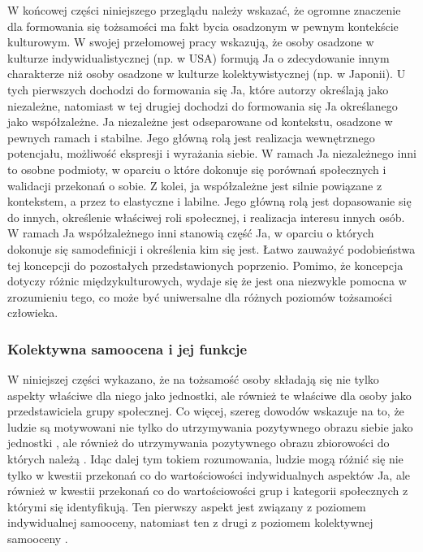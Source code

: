 \documentclass[man]{apa6}
\begin{document}
W końcowej części niniejszego przeglądu należy wskazać, że ogromne znaczenie dla formowania się tożsamości ma fakt bycia osadzonym w pewnym kontekście kulturowym. W swojej przełomowej pracy \textcite{markus1991culture} wskazują, że osoby osadzone w kulturze indywidualistycznej (np. w USA) formują Ja o zdecydowanie innym charakterze niż osoby osadzone w kulturze kolektywistycznej (np. w Japonii). U tych pierwszych dochodzi do formowania się Ja, które autorzy określają jako niezależne, natomiast w tej drugiej dochodzi do formowania się Ja określanego jako współzależne. Ja niezależne jest odseparowane od kontekstu, osadzone w pewnych ramach i stabilne. Jego główną rolą jest realizacja wewnętrznego potencjału, możliwość ekspresji i wyrażania siebie. W ramach Ja niezależnego inni to osobne podmioty, w oparciu o które dokonuje się porównań społecznych i walidacji przekonań o sobie. Z kolei, ja współzależne jest silnie powiązane z kontekstem, a przez to elastyczne i labilne. Jego główną rolą jest dopasowanie się do innych, określenie właściwej roli społecznej, i realizacja interesu innych osób. W ramach Ja współzależnego inni stanowią część Ja, w oparciu o których dokonuje się samodefinicji i określenia kim się jest. Łatwo zauważyć podobieństwa tej koncepcji do pozostałych przedstawionych poprzenio. Pomimo, że koncepcja \textcite{markus1991culture} dotyczy różnic międzykulturowych, wydaje się że jest ona niezwykle pomocna w zrozumieniu tego, co może być uniwersalne dla różnych poziomów tożsamości człowieka.

\subsubsection{Kolektywna samoocena i jej funkcje}

W niniejszej części wykazano, że na tożsamość osoby składają się nie tylko aspekty właściwe dla niego jako jednostki, ale również te właściwe dla osoby jako przedstawiciela grupy społecznej. Co więcej, szereg dowodów wskazuje na to, że ludzie są motywowani nie tylko do utrzymywania pozytywnego obrazu siebie jako jednostki \parencite[patrz,][]{greenwald1980totalitarian}, ale również do utrzymywania pozytywnego obrazu zbiorowości do których należą \parencite{tajfel1986social}. Idąc dalej tym tokiem rozumowania, ludzie mogą różnić się nie tylko w kwestii przekonań co do wartościowości indywidualnych aspektów Ja, ale również w kwestii przekonań co do wartościowości grup i kategorii społecznych z którymi się identyfikują. Ten pierwszy aspekt jest związany z poziomem indywidualnej samooceny, natomiast ten z drugi z poziomem kolektywnej samooceny \parencite{crocker1990collective}.\\
\end{document}
